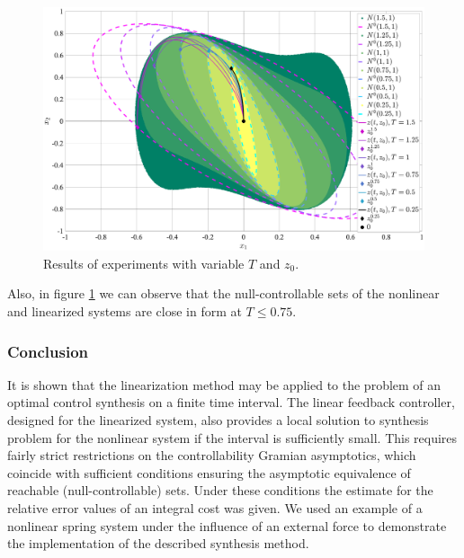 \documentclass[../main.tex]{subfiles}
\begin{document}
\begin{figure}
    \centering
    \includegraphics[width=\linewidth]{images/GusevMIOsipov_Duffing_variable_z0.eps}
    \caption{Results of experiments with variable $T$ and $z_0$.}
    \label{fig:series2}
\end{figure}

Also, in figure \ref{fig:series2} we can observe that the null-controllable sets of the nonlinear and linearized systems are close in form at $ T \leqslant 0.75$. 

\subsubsection{Conclusion}
It is shown that the linearization method may be applied
to the problem of an optimal control synthesis on a finite time interval. The  linear feedback controller, designed for the linearized  system, also provides a local solution to synthesis problem  for the nonlinear system if the interval is sufficiently small.  This requires fairly strict restrictions on the   controllability Gramian asymptotics, which  coincide with sufficient conditions ensuring the asymptotic equivalence of reachable  (null-controllable) sets. Under these conditions the estimate for the relative error  values of an integral cost was given. We used an example of a nonlinear spring system under the influence of an external force to demonstrate the implementation of the described synthesis method. 
\end{document}

